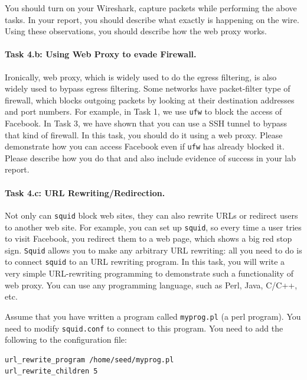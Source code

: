You should turn on your Wireshark, capture packets while 
performing the above tasks. In your report, you should describe 
what exactly is happening on the wire. Using these observations, you
should describe how the web proxy works.


\paragraph{Task 4.b: Using Web Proxy to evade Firewall.}
Ironically, web proxy, which is widely used to do the egress 
filtering, is also widely used to bypass egress filtering.
Some networks have packet-filter type of firewall, which 
blocks outgoing packets by looking at their destination
addresses and port numbers. For example, in Task 1,
we use {\tt ufw} to block the access of Facebook. 
In Task 3, we have shown that you can use a SSH tunnel to 
bypass that kind of firewall. In this task, 
you should do it using a web proxy. Please 
demonstrate how you can access Facebook even if {\tt ufw}
has already blocked it. Please describe how you do that and 
also include evidence of success in your lab report.






\paragraph{Task 4.c: URL Rewriting/Redirection.}

Not only can {\tt squid} block web sites, they can also 
rewrite URLs or redirect users to another web site. 
For example, you can set up {\tt squid}, so every time a user
tries to visit Facebook, you redirect them to a web page, 
which shows a big red stop sign. {\tt Squid} allows you 
to make any arbitrary URL rewriting: all you need to do is to 
connect {\tt squid} to an URL rewriting program. In 
this task, you will write a very simple URL-rewriting 
programming to demonstrate such a functionality of 
web proxy. You can use any programming language, such as 
Perl, Java, C/C++, etc.

Assume that you have written a program called {\tt myprog.pl} (a perl 
program). You need to modify {\tt squid.conf} to connect
to this program. You need to add the following 
to the configuration file: 
\begin{Verbatim}[frame=single] 
url_rewrite_program /home/seed/myprog.pl
url_rewrite_children 5
\end{Verbatim}

